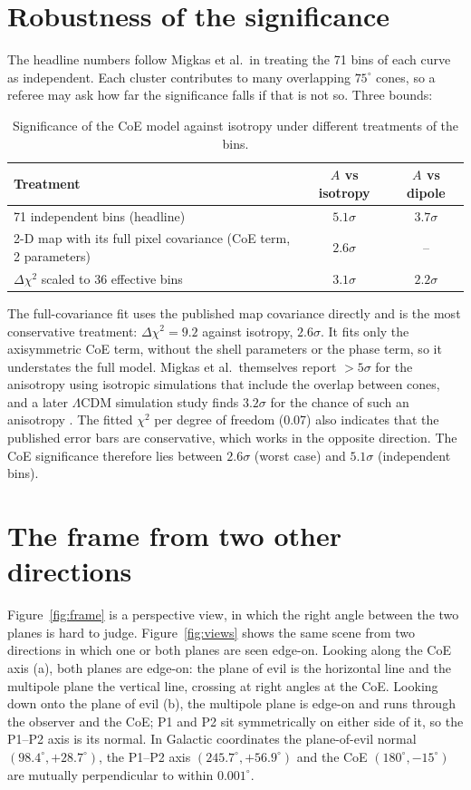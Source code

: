 \documentclass[11pt,a4paper]{article}
\newcommand{\dg}{^\circ}
\begin{document}
\section{Robustness of the significance}\label{app:robust}
The headline numbers follow Migkas et al.\ in treating the 71 bins of each curve as independent. Each cluster contributes to many overlapping $75\dg$ cones, so a referee may ask how far the significance falls if that is not so. Three bounds:

\begin{table}[H]\centering\small
\caption{Significance of the CoE model against isotropy under different treatments of the bins.}\label{tab:robust}
\begin{tabular}{lcc}\toprule
Treatment & $A$ vs isotropy & $A$ vs dipole\\\midrule
71 independent bins (headline) & $5.1\sigma$ & $3.7\sigma$\\
2-D map with its full pixel covariance (CoE term, 2 parameters) & $2.6\sigma$ & --\\
$\Delta\chi^2$ scaled to 36 effective bins & $3.1\sigma$ & $2.2\sigma$\\\bottomrule
\end{tabular}
\end{table}

The full-covariance fit uses the published map covariance directly and is the most conservative treatment: $\Delta\chi^2=9.2$ against isotropy, $2.6\sigma$. It fits only the axisymmetric CoE term, without the shell parameters or the phase term, so it understates the full model. Migkas et al.\ themselves report $>5\sigma$ for the anisotropy using isotropic simulations that include the overlap between cones, and a later $\Lambda$CDM simulation study finds $3.2\sigma$ for the chance of such an anisotropy \cite{He25}. The fitted $\chi^2$ per degree of freedom (0.07) also indicates that the published error bars are conservative, which works in the opposite direction. The CoE significance therefore lies between $2.6\sigma$ (worst case) and $5.1\sigma$ (independent bins).

\section{The frame from two other directions}\label{app:views}
Figure~\ref{fig:frame} is a perspective view, in which the right angle between the two planes is hard to judge. Figure~\ref{fig:views} shows the same scene from two directions in which one or both planes are seen edge-on. Looking along the CoE axis (a), both planes are edge-on: the plane of evil is the horizontal line and the multipole plane the vertical line, crossing at right angles at the CoE. Looking down onto the plane of evil (b), the multipole plane is edge-on and runs through the observer and the CoE; P1 and P2 sit symmetrically on either side of it, so the P1--P2 axis is its normal. In Galactic coordinates the plane-of-evil normal $(98.4\dg,+28.7\dg)$, the P1--P2 axis $(245.7\dg,+56.9\dg)$ and the CoE $(180\dg,-15\dg)$ are mutually perpendicular to within $0.001\dg$.
\end{document}
